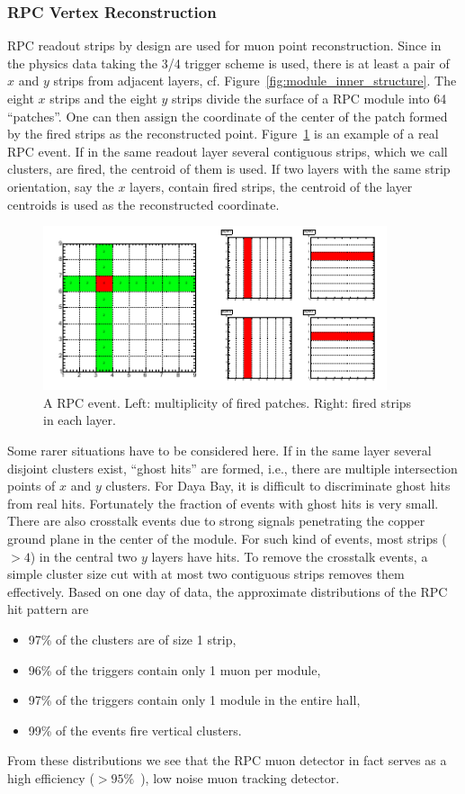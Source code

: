 \subsubsection{RPC Vertex Reconstruction}
RPC readout strips by design are used for muon point reconstruction. Since in the physics data taking the 3/4 trigger scheme is used, there is at least a pair of $x$ and $y$ strips from adjacent layers, cf. Figure~\ref{fig:module_inner_structure}. The eight $x$ strips and the eight $y$ strips divide the surface of a RPC module into 64 ``patches''. One can then assign the coordinate of the center of the patch formed by the fired strips as the reconstructed point. Figure~\ref{fig:RPC_event} is an example of a real RPC event. If in the same readout layer several contiguous strips, which we call clusters, are fired, the centroid of them is used. If two layers with the same strip orientation, say the $x$ layers, contain fired strips, the centroid of the layer centroids is used as the reconstructed coordinate.
\begin{figure}
	\centering
	\includegraphics[width=0.9\textwidth]{figures/chap5/RPC_event.pdf}
	\caption{A RPC event. Left: multiplicity of fired patches. Right: fired strips in each layer.}
	\label{fig:RPC_event}
\end{figure}

Some rarer situations have to be considered here. If in the same layer several disjoint clusters exist, ``ghost hits'' are formed, i.e., there are multiple intersection points of $x$ and $y$ clusters. For Daya Bay, it is difficult to discriminate ghost hits from real hits. Fortunately the fraction of events with ghost hits is very small. There are also crosstalk events due to strong signals penetrating the copper ground plane in the center of the module. For such kind of events, most strips ($>4$) in the central two $y$ layers have hits. To remove the crosstalk events, a simple cluster size cut with at most two contiguous strips removes them effectively. Based on one day of data, the approximate distributions of the RPC hit pattern are
\begin{itemize}
	\item 97\% of the clusters are of size 1 strip,
	\item 96\% of the triggers contain only 1 muon per module,
	\item 97\% of the triggers contain only 1 module in the entire hall,
	\item 99\% of the events fire vertical clusters.
\end{itemize}
From these distributions we see that the RPC muon detector in fact serves as a high efficiency ($>95\%$~\cite{Ning2013}), low noise muon tracking detector.


